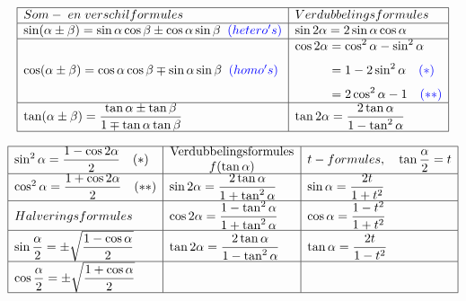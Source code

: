 \documentclass[a5paper]{article}
\begin{document}
\[
\begin{array}{|l|l|}
\hline
{\scriptsize {Som-\;en\;verschilformules}} & 
{\scriptsize {Verdubbelingsformules}} \\ \hline
\sin(\alpha \pm \beta) = \sin\alpha \cos\beta \pm \cos\alpha \sin\beta \;\; \textcolor{blue}{\scriptsize (hetero's)} & 
\sin 2\alpha = 2\sin\alpha \cos\alpha \\ \hline
\cos(\alpha \pm \beta) = \cos\alpha \cos\beta \mp \sin\alpha \sin\beta \;\; \textcolor{blue}{\scriptsize (homo's)} & 
\begin{aligned}
\cos 2\alpha &= \cos^2\alpha - \sin^2\alpha \\[4pt]
             &= 1 - 2\sin^2\alpha \quad \textcolor{blue}{\scriptsize (*)} \\[4pt]
             &= 2\cos^2\alpha - 1 \quad \textcolor{blue}{\scriptsize (**)}
\end{aligned} \\ \hline
\tan(\alpha \pm \beta) = \dfrac{\tan\alpha \pm \tan\beta}{1 \mp \tan\alpha \tan\beta} & 
\tan 2\alpha = \dfrac{2\tan\alpha}{1 - \tan^2\alpha} \\ \hline
\end{array}
\]


\[
\begin{array}{|l|l|l|}
\hline
\sin^2\alpha = \dfrac{1 - \cos 2\alpha}{2} \quad (*) & 
\parbox{3.5cm}{\centering Verdubbelingsformules \\ $f(\tan\alpha)$} & 
t-formules, \quad \tan\dfrac{\alpha}{2} = t \\ \hline

\cos^2\alpha = \dfrac{1 + \cos 2\alpha}{2} \quad (**) & 
\sin 2\alpha = \dfrac{2\tan\alpha}{1 + \tan^2\alpha} & 
\sin\alpha = \dfrac{2t}{1 + t^2} \\ \hline

Halveringsformules & 
\cos 2\alpha = \dfrac{1 - \tan^2\alpha}{1 + \tan^2\alpha} & 
\cos\alpha = \dfrac{1 - t^2}{1 + t^2} \\ \hline

\sin\dfrac{\alpha}{2} = \pm\sqrt{\dfrac{1 - \cos\alpha}{2}} & 
\tan 2\alpha = \dfrac{2\tan\alpha}{1 - \tan^2\alpha} & 
\tan\alpha = \dfrac{2t}{1 - t^2} \\ \hline

\cos\dfrac{\alpha}{2} = \pm\sqrt{\dfrac{1 + \cos\alpha}{2}} & & \\ \hline
\end{array}
\]
\end{document}
